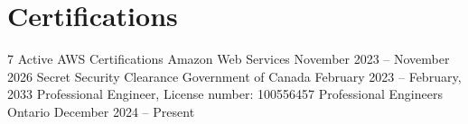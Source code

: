 \documentclass[a4paper,11pt]{article}
\begin{document}
\sectionsep
% 

\section{Certifications}
\begin{subheading}
    \resumeCert
    {7 Active AWS Certifications \href{https://www.credly.com/users/christian-boin}{\faExternalLink} }
    {Amazon Web Services}
    {November 2023 -- November 2026}
    \resumeCert
	{Secret Security Clearance}
	{Government of Canada}
	{February 2023 -- February, 2033}
	\resumeCert
	{Professional Engineer, License number: 100556457}
	{Professional Engineers Ontario}
	{December 2024 -- Present}
\end{subheading}

% 
\end{document}
